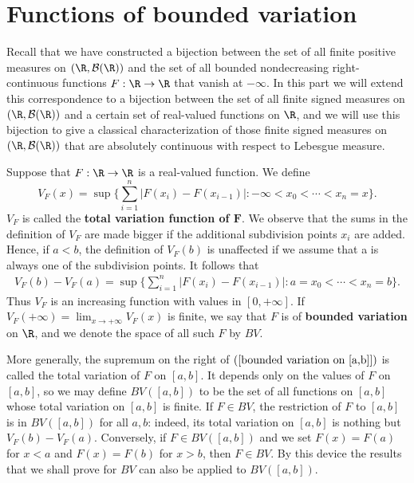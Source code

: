 \section{Functions of bounded variation}
Recall that we have constructed a bijection between the set of all finite positive measures on $(\R,\mathcal{B}(\R))$ and the set of all bounded nondecreasing right-continuous functions $F:\R\to\R$ that vanish at $-\infty$. In this part we will extend this correspondence to a bijection between the set of all finite signed measures on $(\R,\mathcal{B}(\R))$ and a certain set of real-valued functions on $\R$, and we will use this bijection to give a classical characterization of those finite signed measures on $(\R,\mathcal{B}(\R))$ that are absolutely continuous with respect to Lebesgue measure.\par
Suppose that $F:\R\to\R$ is a real-valued function. We define
\[V_F(x)=\sup\{\sum_{i=1}^{n}|F(x_i)-F(x_{i-1})|:-\infty<x_0<\cdots<x_n=x\}.\]
$V_F$ is called the \textbf{total variation function of $\bm{F}$}. We observe that the sums in the definition of $V_F$ are made bigger if the additional subdivision points $x_i$ are added. Hence, if $a<b$, the definition of $V_F(b)$ is unaffected if we assume that a is always
one of the subdivision points. It follows that
\begin{align}\label{bounded variation on [a,b]}
V_F(b)-V_F(a)=\sup\{\sum_{i=1}^{n}|F(x_i)-F(x_{i-1})|:a=x_0<\cdots<x_n=b\}.\end{align}
Thus $V_F$ is an increasing function with values in $[0,+\infty]$. If $V_F(+\infty)=\lim_{x\to+\infty}V_F(x)$ is finite, we say that $F$ is of \textbf{bounded variation} on $\R$, and we denote the space of all such $F$ by $BV$.\par
More generally, the supremum on the right of $(\ref{bounded variation on [a,b]})$ is called the total variation of $F$ on $[a,b]$. It depends only on the values of $F$ on $[a,b]$, so we may define $BV([a,b])$ to be the set of all functions on $[a,b]$ whose total variation on $[a,b]$ is finite. If $F\in BV$, the restriction of $F$ to $[a,b]$ is in $BV([a,b])$ for all $a,b$: indeed, its total variation on $[a,b]$ is nothing but $V_F(b)-V_F(a)$. Conversely, if $F\in BV([a,b])$ and we set $F(x)=F(a)$ for $x<a$ and $F(x)=F(b)$ for $x>b$, then $F\in BV$. By this device the results that we shall prove for $BV$ can also be applied to $BV([a,b])$.
